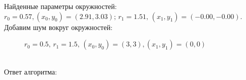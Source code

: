 \documentclass[12pt,twoside]{article}
\begin{document}
Найденные параметры окружностей: $r_0 = 0.57, (x_0, y_0) = (2.91, 3.03); \, r_1 = 1.51, \, (x_1, y_1) = (-0.00, -0.00)$. \newpage
Добавим шум вокруг окружностей: \\
\begin{figure}[h]
\caption{$r_0 = 0.5, \, r_1 = 1.5, \, (x_0, y_0) = (3, 3), (x_1, y_1) = (0, 0)$}
\end{figure} \\
Ответ алгоритма: \\
\begin{figure}[h]
\end{figure}\\
\end{document}
